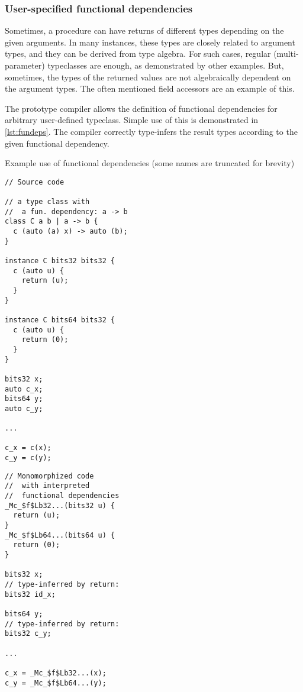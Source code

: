 \subsubsection{User-specified functional dependencies}
\label{sec:uspecFD}

Sometimes, a procedure can have returns of different types depending on the given arguments. In many instances, these types are closely related to argument types, and they can be derived from type algebra. For such cases, regular (multi-parameter) typeclasses are enough, as demonstrated by other examples. But, sometimes, the types of the returned values are not algebraically dependent on the argument types. The often mentioned field accessors are an example of this.

The prototype compiler allows the definition of functional dependencies for arbitrary user-defined typeclass. Simple use of this is demonstrated in \cref{lst:fundeps}. The compiler correctly type-infers the result types according to the given functional dependency.

\begin{codex}
    \caption{Example use of functional dependencies (some names are truncated for brevity)}
    \label{lst:fundeps}
    \begin{center}
    \begin{minipage}{0.5\linewidth}
    \begin{lstlisting}[basicstyle=\scriptsize\ttfamily]
// Source code

// a type class with
//  a fun. dependency: a -> b
class C a b | a -> b {
  c (auto (a) x) -> auto (b);
}

instance C bits32 bits32 {
  c (auto u) {
    return (u);
  }
}

instance C bits64 bits32 {
  c (auto u) {
    return (0);
  }
}

bits32 x;
auto c_x;
bits64 y;
auto c_y;

...

c_x = c(x);
c_y = c(y);
    \end{lstlisting}
    \end{minipage}%
    \begin{minipage}{0.5\linewidth}
    \begin{lstlisting}[basicstyle=\scriptsize\ttfamily]
// Monomorphized code
//  with interpreted
//  functional dependencies
_Mc_$f$Lb32...(bits32 u) {
  return (u);
}
_Mc_$f$Lb64...(bits64 u) {
  return (0);
}

bits32 x;
// type-inferred by return:
bits32 id_x;

bits64 y;
// type-inferred by return:
bits32 c_y;

...

c_x = _Mc_$f$Lb32...(x);
c_y = _Mc_$f$Lb64...(y);
    \end{lstlisting}
    \end{minipage}
    \end{center}
\end{codex}

